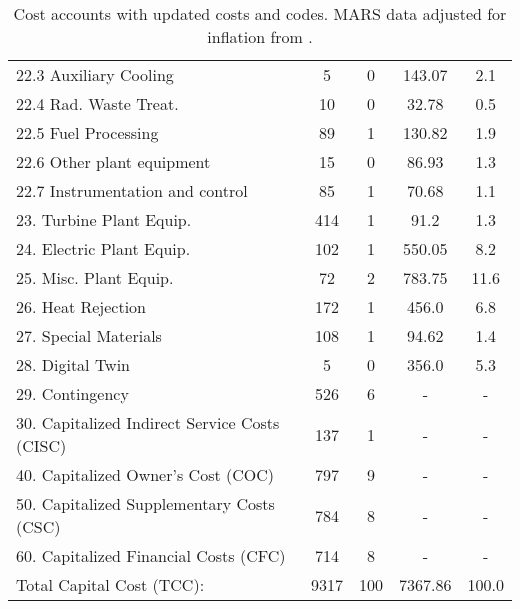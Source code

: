 \begin{table}[h!]
{\begin{tabular}{lcccc}
\hspace{10mm}22.3 Auxiliary Cooling & 5 & 0 & 143.07 & 2.1 \\
\hspace{10mm}22.4 Rad. Waste Treat. & 10 & 0 & 32.78 & 0.5 \\
\hspace{10mm}22.5 Fuel Processing & 89 & 1 & 130.82 & 1.9 \\
\hspace{10mm}22.6 Other plant equipment & 15 & 0 & 86.93 & 1.3 \\
\hspace{10mm}22.7 Instrumentation and control & 85 & 1 & 70.68 & 1.1 \\
\hspace{5mm}23. Turbine Plant Equip. & 414 & 1 & 91.2 & 1.3 \\
\hspace{5mm}24. Electric Plant Equip. & 102 & 1 & 550.05 & 8.2 \\
\hspace{5mm}25. Misc. Plant Equip. & 72 & 2 & 783.75 & 11.6 \\
\hspace{5mm}26. Heat Rejection & 172 & 1 & 456.0 & 6.8 \\
\hspace{5mm}27. Special Materials & 108 & 1 & 94.62 & 1.4 \\
\hspace{5mm}28. Digital Twin & 5 & 0 & 356.0 & 5.3 \\
\hspace{5mm}29. Contingency & 526 & 6 & - & - \\
30. Capitalized Indirect Service Costs (CISC) & 137 & 1 & - & - \\
40. Capitalized Owner’s Cost (COC) & 797 & 9 & - & - \\
50. Capitalized Supplementary Costs (CSC) & 784 & 8 & - & - \\
60. Capitalized Financial Costs (CFC) & 714 & 8 & - & - \\
\hline
Total Capital Cost (TCC): & 9317 & 100 & 7367.86 & 100.0 \\
\hline
\end{tabular}
}
\caption{Cost accounts with updated costs and codes. MARS data adjusted for inflation from \cite{gordon1986mirror}.}
\label{tab:costs_updated_codes}
\end{table}
